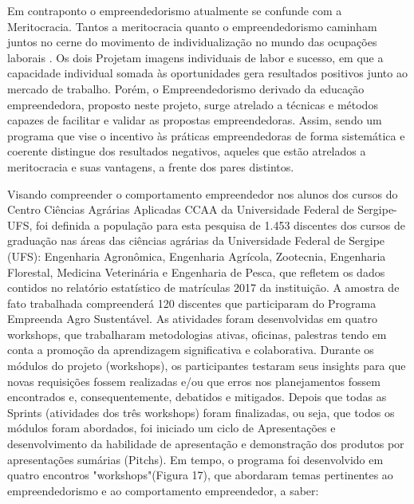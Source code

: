 Em contraponto o empreendedorismo atualmente se confunde com a Meritocracia. Tantos a meritocracia quanto o empreendedorismo caminham juntos no cerne do movimento de individualização no mundo das ocupações laborais \cite{costa_novo_2019}. Os dois Projetam imagens individuais de labor e sucesso, em que a capacidade individual somada às oportunidades gera resultados positivos junto ao mercado de trabalho. Porém, o Empreendedorismo derivado da educação empreendedora, proposto neste projeto, surge atrelado a técnicas e métodos capazes de facilitar e validar as propostas empreendedoras. Assim, sendo um programa que vise o incentivo às práticas empreendedoras de forma sistemática e coerente distingue dos resultados negativos, aqueles que estão atrelados a meritocracia e suas vantagens, a frente dos pares distintos.

Visando compreender o comportamento empreendedor nos alunos dos cursos do Centro
Ciências Agrárias Aplicadas CCAA da Universidade Federal de Sergipe-UFS, foi definida a população para esta pesquisa de 1.453 discentes dos cursos de graduação nas áreas das ciências agrárias da Universidade Federal de Sergipe (UFS): Engenharia Agronômica, Engenharia Agrícola, Zootecnia, Engenharia Florestal, Medicina Veterinária e Engenharia de Pesca, que refletem os dados contidos no relatório estatístico de matrículas 2017 da instituição. A amostra de fato trabalhada compreenderá 120 discentes que participaram do Programa Empreenda Agro Sustentável.
As atividades foram desenvolvidas em quatro workshops, que trabalharam metodologias ativas, oficinas, palestras tendo em conta a promoção da aprendizagem significativa e colaborativa. Durante os módulos do projeto (workshops), os participantes testaram seus insights para que novas requisições fossem realizadas e/ou que erros nos planejamentos fossem encontrados e, consequentemente, debatidos e mitigados. Depois que todas as Sprints (atividades dos três workshops) foram finalizadas, ou seja, que todos os módulos foram abordados, foi iniciado um ciclo de Apresentações e desenvolvimento da habilidade de apresentação e demonstração dos produtos por apresentações sumárias (Pitchs). Em tempo, o programa foi desenvolvido em quatro encontros "workshops"(Figura 17), que abordaram temas pertinentes ao empreendedorismo e ao comportamento empreendedor, a saber:



